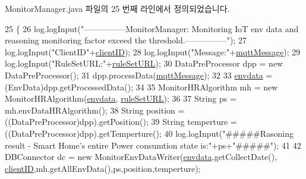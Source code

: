 Monitor\+Manager.\+java 파일의 25 번째 라인에서 정의되었습니다.


\begin{DoxyCode}
25                       \{
26         log.logInput(\textcolor{stringliteral}{"---------------MonitorManager: Monitoring IoT env data and reasoning monitoring
       factor exceed the threshold.---------------"});
27         log.logInput(\textcolor{stringliteral}{"ClientID"}+\mbox{\hyperlink{classcom_1_1github_1_1aites_1_1shlocalaites_1_1aitesmanager_1_1_monitor_manager_ac2cb1a60aa97ac0801f4241fb6ac0b14}{clientID}});
28         log.logInput(\textcolor{stringliteral}{"Message:"}+\mbox{\hyperlink{classcom_1_1github_1_1aites_1_1shlocalaites_1_1aitesmanager_1_1_monitor_manager_aa6b372acb4521c7de09fde3877240694}{mqttMessage}});
29         log.logInput(\textcolor{stringliteral}{"RuleSetURL:"}+\mbox{\hyperlink{classcom_1_1github_1_1aites_1_1shlocalaites_1_1aitesmanager_1_1_monitor_manager_a91d864b58034477cf84abf87943c29a5}{ruleSetURL}});
30         DataPreProcessor dpp = \textcolor{keyword}{new} DataPreProcessor();
31         dpp.processData(\mbox{\hyperlink{classcom_1_1github_1_1aites_1_1shlocalaites_1_1aitesmanager_1_1_monitor_manager_aa6b372acb4521c7de09fde3877240694}{mqttMessage}});
32         
33         \mbox{\hyperlink{classcom_1_1github_1_1aites_1_1shlocalaites_1_1aitesmanager_1_1_monitor_manager_a47e3f99e310e396924a7f0fbef1478cb}{envdata}} = (EnvData)dpp.getProcessedData();
34         
35         MonitorHRAlgorithm mh = \textcolor{keyword}{new} MonitorHRAlgorithm(\mbox{\hyperlink{classcom_1_1github_1_1aites_1_1shlocalaites_1_1aitesmanager_1_1_monitor_manager_a47e3f99e310e396924a7f0fbef1478cb}{envdata}}, 
      \mbox{\hyperlink{classcom_1_1github_1_1aites_1_1shlocalaites_1_1aitesmanager_1_1_monitor_manager_a91d864b58034477cf84abf87943c29a5}{ruleSetURL}});
36     
37         String ps = mh.envDataHRAlgorithm();
38         String position = ((DataPreProcessor)dpp).getPosition();
39         String temperture = ((DataPreProcessor)dpp).getTemperture();
40         log.logInput(\textcolor{stringliteral}{"#####Rasoning result - Smart Home's entire Power consumtion state is:"}+ps+\textcolor{stringliteral}{"#####"});
41         
42         DBConnector dc = \textcolor{keyword}{new} MonitorEnvDataWriter(\mbox{\hyperlink{classcom_1_1github_1_1aites_1_1shlocalaites_1_1aitesmanager_1_1_monitor_manager_a47e3f99e310e396924a7f0fbef1478cb}{envdata}}.getCollectDate(),
      \mbox{\hyperlink{classcom_1_1github_1_1aites_1_1shlocalaites_1_1aitesmanager_1_1_monitor_manager_ac2cb1a60aa97ac0801f4241fb6ac0b14}{clientID}},mh.getAllEnvData(),ps,position,temperture);

\end{DoxyCode}
